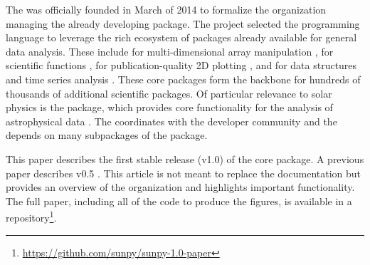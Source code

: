 The \sunpyproj was officially founded in March of 2014 to formalize the organization managing the already developing \sunpypkg package.
The project selected the \python programming language to leverage the rich ecosystem of packages already available for general data analysis.
These include \numpy for multi-dimensional array manipulation \citep{numpy}, \scipy for scientific functions \citep{scipy}, \matplotlib for publication-quality 2D plotting \citep{matplotlib}, and \pandas for data structures and time series analysis \citep{pandas}.
These core packages form the backbone for hundreds of thousands of additional scientific \python packages.
Of particular relevance to solar physics is the \astropypkg package, which provides core functionality for the analysis of astrophysical data \citep{astropy2018}.
The \sunpyproj coordinates with the \astropy developer community and the \sunpypkg depends on many subpackages of the \astropypkg package.

This paper describes the first stable release (v1.0) of the core package.
A previous paper describes v0.5 \citep{Community:2015cy}.
This article is not meant to replace the \sunpypkg documentation but provides an overview of the organization and highlights important functionality.
The full paper, including all of the code to produce the figures, is available in a \github repository\footnote{\url{https://github.com/sunpy/sunpy-1.0-paper}}.